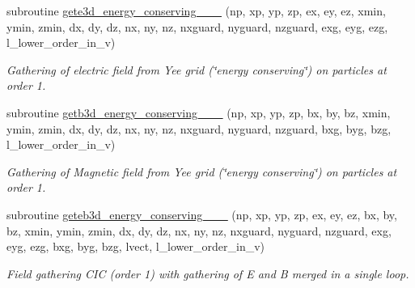 \begin{DoxyCompactItemize}
subroutine \hyperlink{field__gathering__3d__o1_8_f90_a573c1601d8884aa699121b456d176757}{gete3d\+\_\+energy\+\_\+conserving\+\_\+\_\+\_} (np, xp, yp, zp, ex, ey, ez, xmin, ymin, zmin,                                                                                                                                                           dx, dy, dz, nx, ny, nz, nxguard, nyguard, nzguard,                                                                                                                                                   exg, eyg, ezg, l\+\_\+lower\+\_\+order\+\_\+in\+\_\+v)
\begin{DoxyCompactList}\small\item\em Gathering of electric field from Yee grid (\char`\"{}energy conserving\char`\"{}) on particles at order 1. \end{DoxyCompactList}\item 
subroutine \hyperlink{field__gathering__3d__o1_8_f90_a7ba87c0bcb5818f003a2d33921b5e40d}{getb3d\+\_\+energy\+\_\+conserving\+\_\+\_\+\_} (np, xp, yp, zp, bx, by, bz, xmin, ymin, zmin,                                                                                                                                                           dx, dy, dz, nx, ny, nz, nxguard, nyguard, nzguard,                                                                                                                                                   bxg, byg, bzg, l\+\_\+lower\+\_\+order\+\_\+in\+\_\+v)
\begin{DoxyCompactList}\small\item\em Gathering of Magnetic field from Yee grid (\char`\"{}energy conserving\char`\"{}) on particles at order 1. \end{DoxyCompactList}\item 
subroutine \hyperlink{field__gathering__3d__o1_8_f90_ad43c0d4f9417aa987d3ca7f033ef6e69}{geteb3d\+\_\+energy\+\_\+conserving\+\_\+\_\+\_} (np, xp, yp, zp, ex, ey, ez, bx, by, bz, xmin, ymin, zmin,                                                                                                                                                           dx, dy, dz, nx, ny, nz, nxguard, nyguard, nzguard,                                                                                                                                                   exg, eyg, ezg, bxg, byg, bzg, lvect, l\+\_\+lower\+\_\+order\+\_\+in\+\_\+v)
\begin{DoxyCompactList}\small\item\em Field gathering C\+IC (order 1) with gathering of E and B merged in a single loop. \end{DoxyCompactList}\end{DoxyCompactItemize}


